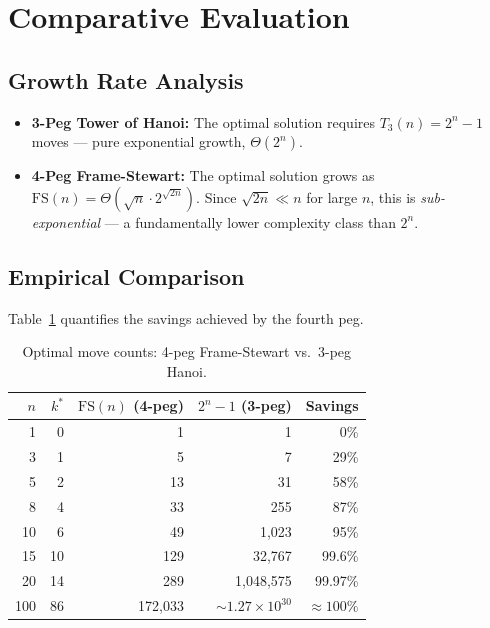 \documentclass[12pt, a4paper]{article}
\begin{document}
\section{Comparative Evaluation}
\label{sec:comparative}

\subsection{Growth Rate Analysis}

\begin{itemize}[leftmargin=2em]
\item \textbf{3-Peg Tower of Hanoi:}
The optimal solution requires $T_3(n) = 2^n - 1$ moves — pure exponential growth, $\Theta(2^n)$.

\item \textbf{4-Peg Frame-Stewart:}
The optimal solution grows as $\text{FS}(n) = \Theta\!\left(\sqrt{n} \cdot 2^{\sqrt{2n}}\right)$.
Since $\sqrt{2n} \ll n$ for large $n$, this is \emph{sub-exponential} — a fundamentally lower complexity class than $2^n$.
\end{itemize}

\subsection{Empirical Comparison}

Table~\ref{tab:compare} quantifies the savings achieved by the fourth peg.

\begin{table}[h]
\centering
\begin{tabular}{r r r r r}
\toprule
$n$ & $k^*$ & $\text{FS}(n)$ (4-peg) & $2^n - 1$ (3-peg) & Savings \\
\midrule
1   & 0   & 1           & 1             & 0\%     \\
3   & 1   & 5           & 7             & 29\%    \\
5   & 2   & 13          & 31            & 58\%    \\
8   & 4   & 33          & 255           & 87\%    \\
10  & 6   & 49          & 1,023         & 95\%    \\
15  & 10  & 129         & 32,767        & 99.6\%  \\
20  & 14  & 289         & 1,048,575     & 99.97\% \\
100 & 86  & 172,033     & $\sim 1.27 \times 10^{30}$ & $\approx 100\%$ \\
\bottomrule
\end{tabular}
\caption{Optimal move counts: 4-peg Frame-Stewart vs.\ 3-peg Hanoi.}
\label{tab:compare}
\end{table}
\end{document}
